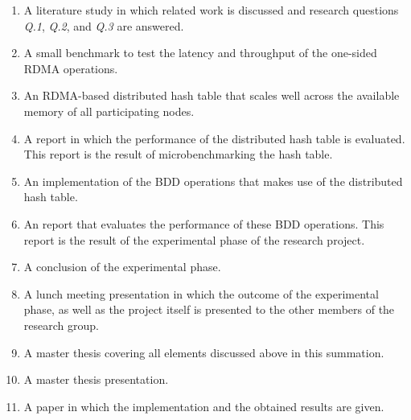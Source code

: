 \begin{enumerate}
	\item A literature study in which related work is discussed and research questions \textit{Q.1}, \textit{Q.2}, and \textit{Q.3} are answered.
	\item A small benchmark to test the latency and throughput of the one-sided RDMA operations.
	\item An RDMA-based distributed hash table that scales well across the available memory of all participating nodes.
	\item A report in which the performance of the distributed hash table is evaluated. This report is the result of microbenchmarking the hash table.
	\item An implementation of the BDD operations that makes use of the distributed hash table.
	\item An report that evaluates the performance of these BDD operations. This report is the result of the experimental phase of the research project.
	\item A conclusion of the experimental phase.
	\item A lunch meeting presentation in which the outcome of the experimental phase, as well as the project itself is presented to the other members of the research group.
	\item A master thesis covering all elements discussed above in this summation.
	\item A master thesis presentation.
	\item A paper in which the implementation and the obtained results are given.
\end{enumerate}